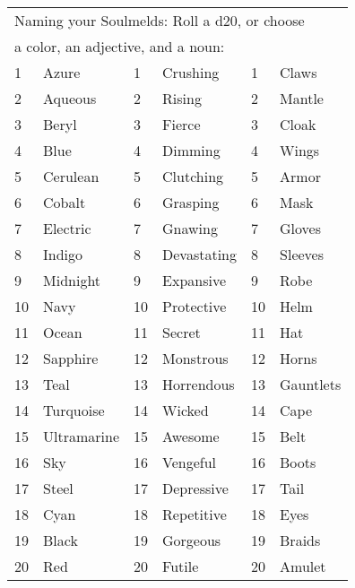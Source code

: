 


\begin{table}[tbh]
\begin{small}
\begin{center}
\noindent \begin{tabular}{|ll||ll||ll|}
\multicolumn{6}{l}{Naming your Soulmelds: Roll a d20, or choose}\\
\multicolumn{6}{l}{a color, an adjective, and a noun:} \\
\hline 1&Azure&1&Crushing&1&Claws\\
2&Aqueous&2&Rising&2&Mantle\\
3&Beryl&3&Fierce&3&Cloak\\
4&Blue&4&Dimming&4&Wings\\
5&Cerulean&5&Clutching&5&Armor\\
6&Cobalt&6&Grasping&6&Mask\\
7&Electric&7&Gnawing&7&Gloves \\
8&Indigo&8&Devastating&8&Sleeves\\
9&Midnight&9&Expansive&9&Robe\\
10&Navy&10&Protective&10&Helm\\
11&Ocean&11&Secret&11&Hat\\
12&Sapphire&12&Monstrous&12&Horns\\
13&Teal&13&Horrendous&13&Gauntlets\\
14&Turquoise&14&Wicked&14&Cape\\
15&Ultramarine&15&Awesome&15&Belt\\
16&Sky&16&Vengeful&16&Boots\\
17&Steel&17&Depressive&17&Tail\\
18&Cyan&18&Repetitive&18&Eyes\\
19&Black&19&Gorgeous&19&Braids\\
20&Red&20&Futile&20&Amulet\\ \hline
\end{tabular}
\end{center}
\end{small}
\end{table}
